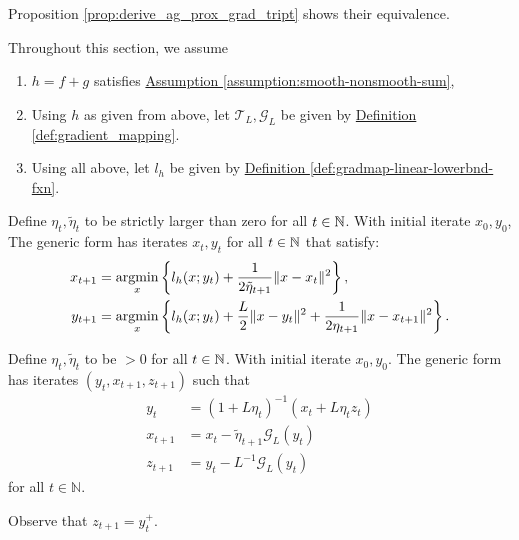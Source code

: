 \documentclass[12pt]{article}
\begin{document}
    {Proposition \ref*{prop:derive_ag_prox_grad_tript}} 
    shows their equivalence. 
    \par
    Throughout this section, we assume 
    \begin{enumerate}
        \item $h=f + g$ satisfies 
            \hyperref[assumption:smooth-nonsmooth-sum]
            {Assumption \ref*{assumption:smooth-nonsmooth-sum}}, 
        \item Using $h$ as given from above, let $\mathcal T_L, \mathcal G_L$ be given by 
            \hyperref[def:gradient_mapping]
            {Definition \ref*{def:gradient_mapping}}. 
        \item Using all above, let $l_h$ be given by 
            \hyperref[def:gradmap-linear-lowerbnd-fxn]
            {Definition \ref*{def:gradmap-linear-lowerbnd-fxn}}. 
    \end{enumerate}

    \begin{definition}
    \label{def:ag_prox_grad_ppm}
        Define $\eta_t, \tilde \eta_t$ to be strictly larger than zero for all $t \in \mathbb N$. 
        With initial iterate $x_0, y_0$, 
        The generic form has iterates $x_t, y_t$ for all $t \in \mathbb N$ that satisfy: 
        $$
        \begin{aligned}
            x_{t + 1} &= \mathop{\rm argmin}\limits_{x} \left\lbrace
                l_h(x; y_t) + \frac{1}{2\tilde \eta_{t + 1}} 
                \Vert x - x_t\Vert^2
            \right\rbrace,
            \\
            y_{t + 1}&= 
            \mathop{\rm argmin}\limits_{x}
            \left\lbrace
                l_h(x; y_t) + \frac{L}{2}\Vert x - y_t\Vert^2 + 
                \frac{1}{2\eta_{t + 1}} \Vert x - x_{t + 1}\Vert^2
            \right\rbrace.
        \end{aligned}
        $$
    \end{definition}

    \begin{definition}
    \label{def:ag_prox_grad_generic}
        Define $\eta_t, \tilde \eta_t$ to be $> 0$ for all $t \in \mathbb N$. 
        With initial iterate $x_0, y_0$.
        The generic form has iterates $(y_t, x_{t + 1}, z_{t + 1})$ such that 
        $$
        \begin{aligned}
            y_t &= (1 + L\eta_t)^{-1}(x_t + L\eta_t z_t)
            \\
            x_{t + 1} &= x_t - \tilde \eta_{t + 1} \mathcal G_L(y_t)
            \\
            z_{t + 1} &= y_t - L^{-1}\mathcal G_L(y_t)
        \end{aligned}
        $$
        for all $t\in \mathbb N$. 
    \end{definition}
    \begin{remark}
        Observe that $z_{t + 1} = y_t^+$. 
    \end{remark}
    
\end{document}
